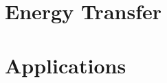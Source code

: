 \documentclass[tikz]{beamer}
\begin{document}
\section{Energy Transfer}

\section{Applications}

\end{document}
